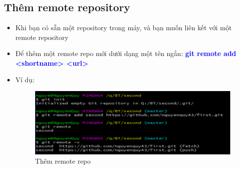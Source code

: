 \documentclass[12pt,a4paper]{report}
\begin{document}
\subsection{Thêm remote repository} 
\begin{itemize}
\item Khi bạn có sẵn một repository trong máy, và bạn muốn liên kết với một remote repository
\item Để thêm một remote repo mới dưới dạng một tên ngắn: \textcolor{blue}{\bf git remote add <shortname> <url>}
\item Ví dụ: 

\begin{figure}[!ht]
	\centering
	\includegraphics[width=0.8\linewidth]{screenshot034}
\caption{Thêm remote repo}	
	\label{fig:screenshot034}
	\end{figure}
\end{itemize}
\end{document}
